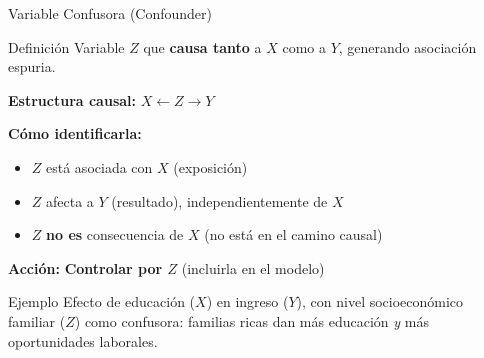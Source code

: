 \documentclass[aspectratio=169,11pt]{beamer}
\newcommand{\highlight}[1]{\textcolor{uddlight}{\bfseries #1}}
\begin{document}
\begin{frame}{Variable Confusora (Confounder)}
\small
\begin{block}{Definici\'on}
    Variable $Z$ que \textbf{causa tanto} a $X$ como a $Y$, generando asociaci\'on espuria.
\end{block}

\vspace{0.1cm}
\textbf{Estructura causal:} $X \leftarrow Z \rightarrow Y$

\vspace{0.1cm}
\textbf{C\'omo identificarla:}
\begin{itemize}
    \setlength{\itemsep}{1pt}
    \item $Z$ est\'a asociada con $X$ (exposici\'on)
    \item $Z$ afecta a $Y$ (resultado), independientemente de $X$
    \item $Z$ \textbf{no es} consecuencia de $X$ (no est\'a en el camino causal)
\end{itemize}

\vspace{0.1cm}
\textbf{Acci\'on:} \highlight{Controlar por $Z$} (incluirla en el modelo)

\vspace{0.1cm}
\begin{exampleblock}{Ejemplo}
    \scriptsize
    Efecto de educaci\'on ($X$) en ingreso ($Y$), con nivel socioecon\'omico familiar ($Z$) como confusora: familias ricas dan m\'as educaci\'on \textit{y} m\'as oportunidades laborales.
\end{exampleblock}
\end{frame}
\end{document}
